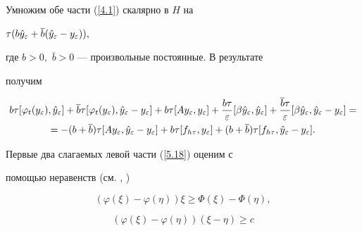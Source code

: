 \begin{pf}


Умножим обе части (\ref{4.1}) скалярно в $H$ на


$ \tau( b \Hat{y}_\varepsilon + \overline{b}(\Hat{y}_\varepsilon -


y_\varepsilon ) ), $


где $ b > 0,$ $\overline{b} > 0 $ --- произвольные постоянные. В результате


получим


\begin{multline}


 b\tau [ \varphi_{t}(y_\varepsilon), \Hat{y}_\varepsilon]+


 \overline{b}\tau [ \varphi _{t}(y_\varepsilon),


 \Hat{y}_\varepsilon - y_\varepsilon ] +


b\tau [ Ay_\varepsilon,y_\varepsilon ] + \frac{b\tau}{\varepsilon}


[ \beta\Hat{y}_\varepsilon,\Hat{y}_\varepsilon ] +


\frac{\overline{b}\tau}{\varepsilon}


[ \beta\Hat{y}_\varepsilon,\Hat{y}_\varepsilon - y_\varepsilon ]


=\\


%


=-(b+\overline{b})\tau [ Ay_\varepsilon ,\Hat{y}_\varepsilon-y_\varepsilon ]


+ b\tau [ f_{h\tau},y_\varepsilon ]


+ (b+\overline{b})\tau [ f_{h\tau},\Hat{y}_\varepsilon-y_\varepsilon ].


\label{5.18}


\end{multline}


Первые два слагаемых левой части (\ref{5.18}) оценим с


помощью неравенств (см. \cite{Dep1}, \cite{DYt23})


\begin{equation}


 ( \varphi(\xi) -\varphi(\eta) )\xi \ge \Phi(\xi) - \Phi(\eta),


 \label{l2*}


\end{equation}


%


\begin{equation}


 ( \varphi ( \xi ) - \varphi ( \eta) ) ( \xi - \eta ) \ge c



\end{equation}
\end{pf}
